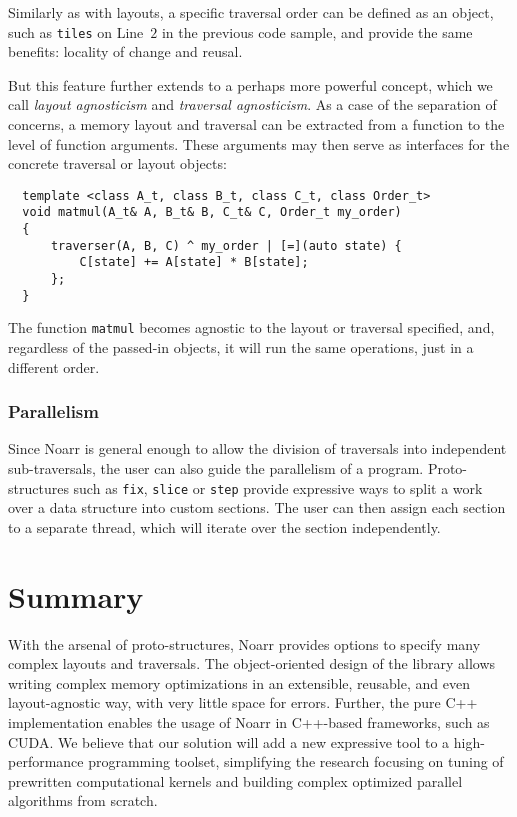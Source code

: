 Similarly as with layouts, a specific traversal order can be defined as an object, such as \texttt{tiles} on Line~$2$ in the previous code sample, and provide the same benefits: locality of change and reusal.

But this feature further extends to a perhaps more powerful concept, which we call \emph{layout agnosticism} and \emph{traversal agnosticism}. As a case of the separation of concerns, a memory layout and traversal can be extracted from a function to the level of function arguments. These arguments may then serve as interfaces for the concrete traversal or layout objects:

\begin{verbatim}
  template <class A_t, class B_t, class C_t, class Order_t>
  void matmul(A_t& A, B_t& B, C_t& C, Order_t my_order)
  {
      traverser(A, B, C) ^ my_order | [=](auto state) {
          C[state] += A[state] * B[state];
      };
  }
\end{verbatim}
The function \texttt{matmul} becomes agnostic to the layout or traversal specified, and, regardless of the passed-in objects, it will run the same operations, just in a different order.

\subsubsection{Parallelism}

Since Noarr is general enough to allow the division of traversals into independent sub-traversals, the user can also guide the parallelism of a program. Proto-structures such as \texttt{fix}, \texttt{slice} or \texttt{step} provide expressive ways to split a work over a data structure into custom sections. The user can then assign each section to a separate thread, which will iterate over the section independently.

\section{Summary}

With the arsenal of proto-structures, Noarr provides options to specify many complex layouts and traversals. The object-oriented design of the library allows writing complex memory optimizations in an extensible, reusable, and even layout-agnostic way, with very little space for errors. Further, the pure C++ implementation enables the usage of Noarr in C++-based frameworks, such as CUDA. We believe that our solution will add a new expressive tool to a high-performance programming toolset, simplifying the research focusing on tuning of prewritten computational kernels and building complex optimized parallel algorithms from scratch.
